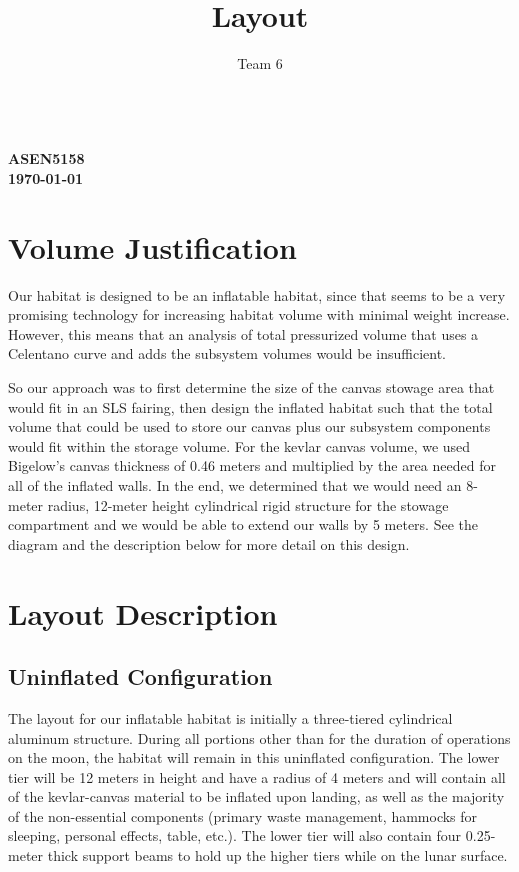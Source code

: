 \documentclass{article}
\renewcommand{\maketitle}{\hspace{-22px}  \textbf{{\theauthor} \\
ASEN5158 \\
\today \\
{\thetitle}} \titlerule}
\begin{document}
  \title{Layout}
  \author{Team 6}

  \maketitle


\section{Volume Justification}

Our habitat is designed to be an inflatable habitat, since that seems to be a very promising technology for increasing habitat volume with minimal weight increase. However, this means that an analysis of total pressurized volume that uses a Celentano curve and adds the subsystem volumes would be insufficient. 

So our approach was to first determine the size of the canvas stowage area that would fit in an SLS fairing, then design the inflated habitat such that the total volume that could be used to store our canvas plus our subsystem components would fit within the storage volume. For the kevlar canvas volume, we used Bigelow's canvas thickness of 0.46 meters and multiplied by the area needed for all of the inflated walls. In the end, we determined that we would need an 8-meter radius, 12-meter height cylindrical rigid structure for the stowage compartment and we would be able to extend our walls by 5 meters. See the diagram and the description below for more detail on this design.

\section{Layout Description}

\subsection{Uninflated Configuration}

The layout for our inflatable habitat is initially a three-tiered cylindrical aluminum structure. During all portions other than for the duration of operations on the moon, the habitat will remain in this uninflated configuration. The lower tier will be 12 meters in height and have a radius of 4 meters and will contain all of the kevlar-canvas material to be inflated upon landing, as well as the majority of the non-essential components (primary waste management, hammocks for sleeping, personal effects, table, etc.). The lower tier will also contain four 0.25-meter thick support beams to hold up the higher tiers while on the lunar surface.
\end{document}
